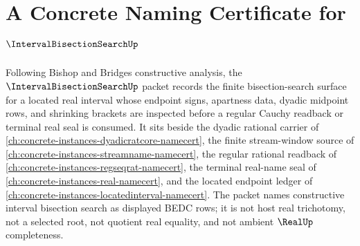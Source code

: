 \chapter{A Concrete Naming Certificate for $\IntervalBisectionSearchUp$}
\label{ch:concrete-instances-interval-bisection-search-namecert}

Following Bishop and Bridges constructive analysis, the $\IntervalBisectionSearchUp$ packet records the finite bisection-search surface for a located real interval whose endpoint signs, apartness data, dyadic midpoint rows, and shrinking brackets are inspected before a regular Cauchy readback or terminal real seal is consumed. It sits beside the dyadic rational carrier of \autoref{ch:concrete-instances-dyadicratcore-namecert}, the finite stream-window source of \autoref{ch:concrete-instances-streamname-namecert}, the regular rational readback of \autoref{ch:concrete-instances-regseqrat-namecert}, the terminal real-name seal of \autoref{ch:concrete-instances-real-namecert}, and the located endpoint ledger of \autoref{ch:concrete-instances-locatedinterval-namecert}. The packet names constructive interval bisection search as displayed BEDC rows; it is not host real trichotomy, not a selected root, not quotient real equality, and not ambient $\RealUp$ completeness.

